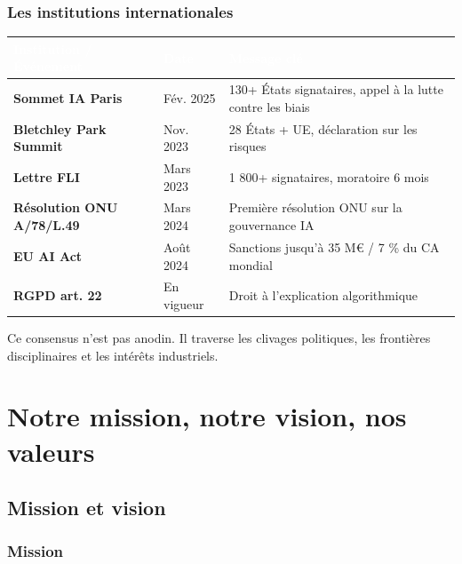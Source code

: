 \documentclass[11pt,a4paper,openany]{book}
\begin{document}
\section{Les institutions internationales}

\begin{center}
\renewcommand{\arraystretch}{1.3}
\small
\begin{tabularx}{\textwidth}{@{}>{\bfseries}p{4cm}p{2cm}X@{}}
\toprule
\rowcolor{navy}
\textcolor{white}{Institution / Événement} & \textcolor{white}{Date} & \textcolor{white}{Message clé} \\
\midrule
\textbf{Sommet IA Paris} & Fév. 2025 & 130+ États signataires, appel à la lutte contre les biais \\
\rowcolor{light}
\textbf{Bletchley Park Summit} & Nov. 2023 & 28 États + UE, déclaration sur les risques \\
\textbf{Lettre FLI} & Mars 2023 & 1 800+ signataires, moratoire 6 mois \\
\rowcolor{light}
\textbf{Résolution ONU A/78/L.49} & Mars 2024 & Première résolution ONU sur la gouvernance IA \\
\textbf{EU AI Act} & Août 2024 & Sanctions jusqu'à 35 M€ / 7 \% du CA mondial \\
\rowcolor{light}
\textbf{RGPD art. 22} & En vigueur & Droit à l'explication algorithmique \\
\bottomrule
\end{tabularx}
\end{center}

\begin{ideabox}
Ce consensus n'est pas anodin. Il traverse les clivages politiques, les frontières disciplinaires et les intérêts industriels.
\end{ideabox}

\clearpage

\part{Notre mission, notre vision, nos valeurs}
\label{part:mission}

\chapter{Mission et vision}

\section{Mission}
\end{document}
